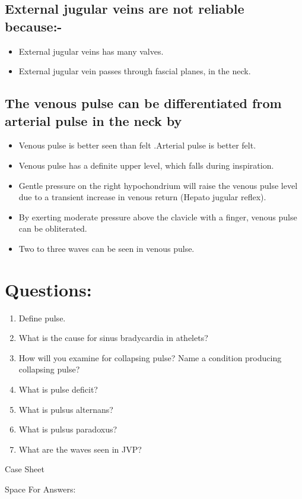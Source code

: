 \documentclass[a4paper,12pt,openany,twoside]{book}
\newcommand{\blankpageForCaseSheet}{
	\newpage
	\thispagestyle{plain}
	\begin{center}
		\huge Case Sheet 
	\end{center}
	\newpage
	\thispagestyle{plain}
	\mbox{}
	}
\newcommand{\blankpageForAnswers}{
	\newpage
	\thispagestyle{plain}
	\begin{center}
		\Large Space For Answers: 
	\end{center}
	}
\begin{document}
\subsection*{External jugular veins are not reliable because:-}
\begin{itemize}
	\item[]{External jugular veins has many valves.}
	\item[]{External jugular vein passes through fascial planes, in the neck. }
\end{itemize}
\subsection*{The venous pulse can be differentiated from arterial pulse in the neck by}
\begin{itemize}
\item[]{Venous pulse is better seen than felt .Arterial pulse is better felt.}
\item[]{Venous pulse has a definite upper level, which falls during inspiration.}
\item[]{Gentle pressure on the right hypochondrium will raise the venous pulse level due to a transient increase in venous return (Hepato jugular reflex).}
\item[]{By exerting moderate pressure above the clavicle with a finger, venous pulse can be obliterated.}
\item[]{Two to three waves can be seen in venous pulse.}
\end{itemize}

\section*{Questions:}
\begin{enumerate}
\item{Define pulse.}
\item{What is the cause for sinus bradycardia in athelets?}
\item{How will you examine for collapsing pulse? Name a condition producing collapsing pulse?}
\item{What is pulse deficit?}
\item{What is pulsus alternans?}
\item{What is pulsus paradoxus?}
\item{What are the waves seen in JVP?}
\end{enumerate}
\blankpageForCaseSheet
\blankpageForAnswers
\end{document}
